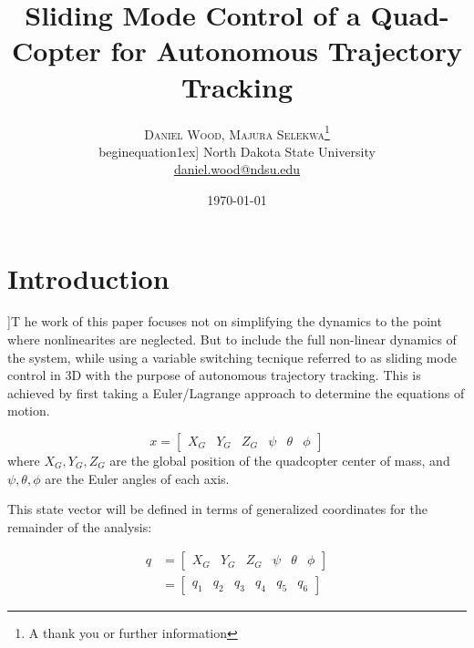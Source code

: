 \documentclass{article}
\title{Sliding Mode Control of a Quad-Copter for Autonomous Trajectory Tracking} %
\author{%
\textsc{Daniel Wood, Majura Selekwa}\thanks{A thank you or further information} \\begin{equation}1ex] %
\normalsize North Dakota State University \\ %
\normalsize \href{mailto:daniel.wood@ndsu.edu}{daniel.wood@ndsu.edu} %
}
\date{\today} %
\begin{document}
\maketitle


\section{Introduction}

]{T} he work of this paper focuses not on simplifying the dynamics to the point where nonlinearites are neglected. But to include the full non-linear dynamics of the system, while using a variable switching tecnique referred to as sliding mode control in 3D with the purpose of autonomous trajectory tracking. This is achieved by first taking a Euler/Lagrange approach to determine the equations of motion.


\begin{equation}
x=[\begin{array}{cccccc}
X_{G} & Y_{G} & Z_{G} & \psi & \theta & \phi\end{array}]
\end{equation}
where $X_{G},Y_{G},Z_{G}$ are the global position of the quadcopter center of mass, and $\psi,\theta,\phi$ are the Euler angles of each axis.

This state vector will be defined in terms of generalized coordinates for the remainder of the analysis:

\begin{equation}
\begin{split}
q &= [\begin{array}{cccccc}
X_{G} & Y_{G} & Z_{G} & \psi & \theta & \phi\end{array}] \\
&= [\begin{array}{cccccc}
q_{1} & q_{2} & q_{3} & q_{4} & q_{5} & q_{6}\end{array}]
\end{split}
\end{equation}
\end{document}
